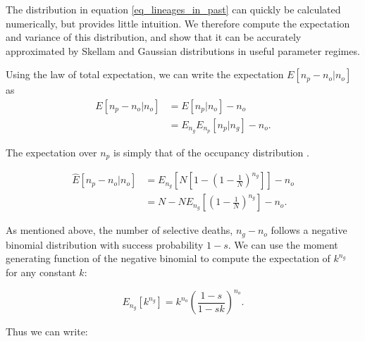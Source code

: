 \documentclass[review,nonatbib]{elsarticle}
\newcommand{\sgcomment}[1]{{\color{red}{SG: #1}}}
\begin{document}
The distribution in equation \ref{eq_lineages_in_past} can quickly be calculated numerically, but
provides little intuition. We therefore compute the
expectation and variance of this distribution, and show that it can be accurately approximated by
Skellam and Gaussian distributions in useful parameter regimes.

Using the law of total expectation, we can write the expectation $E[n_p-n_o | n_o]$ as
\begin{equation*}
  \begin{aligned}
    \label{eq_lineages_approx}
    E[n_p-n_o | n_o] &=        E[n_p | n_o]       - n_o \\
                     &=E_{n_g} E_{n_p}[n_p | n_g] - n_o.
  \end{aligned}
\end{equation*}

The expectation over $n_p$ is simply that of the occupancy distribution \cite{Wakeley2009}.

\begin{equation*}
  \begin{aligned}
    \label{eq_lineages_derive}
    \hat{E}[n_p -n_o | n_o]
    & =   E_{n_g}\left[N\left[1-\left(1 - \frac{1}{N} \right)^{n_g} \right]\right]- n_o\\
    & =   N-N  E_{n_g}\left[\left(1 - \frac{1}{N} \right)^{n_g} \right] -n_o.
  \end{aligned}
\end{equation*}

As mentioned above, the number of selective deaths, $n_g-n_o$ follows a negative binomial
distribution with success probability $1-s$. We can use the moment generating function of the
negative binomial to compute the expectation of $k^{n_g}$ for any constant $k$:

\begin{equation}
  E_{n_g}[k^{n_g}] = k^{n_o}  \left(\frac{1-s}{1-sk}\right)^{n_o}.
  \label{eq_identity}
\end{equation}

Thus we can write:

\end{document}
